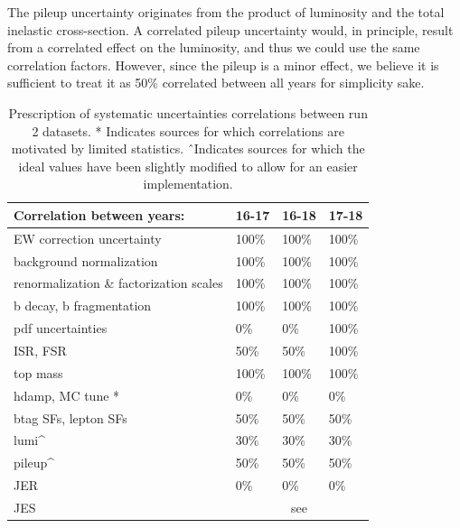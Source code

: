 The pileup uncertainty originates from the product of luminosity and the total inelastic cross-section. A correlated pileup uncertainty would, in principle, result from a correlated effect on the luminosity, and thus we could use the same correlation factors. However, since the pileup is a minor effect, we believe it is sufficient to treat it as 50\% correlated between all years for simplicity sake.
\begin{table}[h]
    \centering
\begin{tabular}{|l|l|l|l|}
\hline
Correlation between years:              & 16-17  & 16-18  & 17-18  \\ \hline \hline
EW correction uncertainty               & 100\%  & 100\%  & 100\%  \\ \hline
background normalization                & 100\%  & 100\%  & 100\%  \\ \hline
renormalization \& factorization scales & 100\%  & 100\%  & 100\%  \\ \hline
b decay, b fragmentation                                 & 100\%  & 100\%  & 100\%  \\ \hline
pdf uncertainties                       & 0\%    & 0\%    & 100\%  \\ \hline
ISR, FSR               & 50\%   & 50\%   & 100\%  \\ \hline
top mass                                & 100\%  & 100\%  & 100\%   \\ \hline
hdamp, MC tune *                        & 0\%    & 0\%    & 0\%    \\ \hline \hline
btag SFs, lepton SFs                    & 50\%   & 50\%   & 50\%   \\ \hline
lumi\^                                  & 30\%   & 30\%   & 30\%   \\ \hline
pileup\^                                & 50\%   & 50\%   & 50\%   \\ \hline
JER                                     & 0\%    & 0\%    & 0\%    \\ \hline
JES                                     & \multicolumn{3}{c|}{see \cite{JECtwiki}} \\ \hline
\end{tabular}
    \caption{Prescription of systematic uncertainties correlations between run 2 datasets. * Indicates sources for which correlations are motivated by limited statistics. \^\ Indicates sources for which the ideal values have been  slightly modified to allow for an easier implementation.}
    \label{tab:run2corr}
\end{table}

